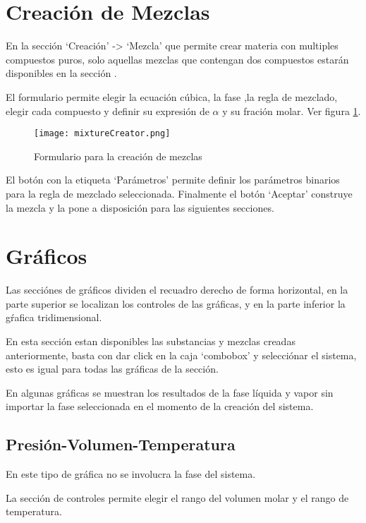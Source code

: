 \section{Creación de Mezclas}\label{sec:webMixtureCreator}

	En la sección `Creación' -> `Mezcla' que permite crear materia con multiples compuestos puros, solo aquellas mezclas que contengan dos compuestos estarán disponibles en la sección .

	El formulario permite elegir la ecuación cúbica, la fase ,la regla de mezclado, elegir cada compuesto y definir su expresión de $\alpha$ y su fración molar. Ver figura \ref{fig:webMixCreator}.

	\begin{figure}
		\texttt{[image: mixtureCreator.png]}
		\caption{Formulario para la creación de mezclas}
		\label{fig:webMixCreator}
	\end{figure}

	El botón con la etiqueta `Parámetros' permite definir los parámetros binarios para la regla de mezclado seleccionada. Finalmente el botón `Aceptar' construye la mezcla y la pone a disposición para las siguientes secciones.

\section{Gráficos}

	Las secciónes de gráficos dividen el recuadro derecho de forma horizontal, en la parte superior se localizan los controles de las gráficas, y en la parte inferior la gŕafica tridimensional.

	En esta sección estan disponibles las substancias y mezclas creadas anteriormente, basta con dar click en la caja `combobox' y selecciónar el sistema, esto es igual para todas las gráficas de la sección.

	En algunas gráficas se muestran los resultados de la fase líquida y vapor sin importar la fase seleccionada en el momento de la creación del sistema.

	\subsection{Presión-Volumen-Temperatura}\label{subsec:pvt}
		En este tipo de gráfica no se involucra la fase del sistema. 

		La sección de controles permite elegir el rango del volumen molar y el rango de temperatura.
		
